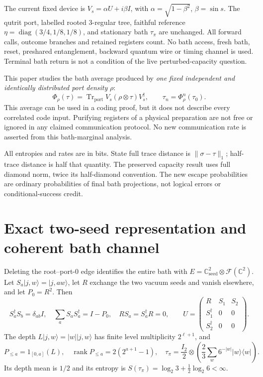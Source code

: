 \documentclass[11pt]{article}
\newcommand{\Tr}{\operatorname{Tr}}
\newcommand{\rank}{\operatorname{rank}}
\newcommand{\ket}[1]{\lvert #1\rangle}
\newcommand{\bra}[1]{\langle #1\rvert}
\begin{document}
The current fixed device is $V_s=\alpha U+i\beta I$, with
$\alpha=\sqrt{1-\beta^2}$, $\beta=\sin s$. The qutrit port, labelled
rooted 3-regular tree, faithful reference
$\eta=\operatorname{diag}(3/4,1/8,1/8)$, and stationary bath $\tau_\pi$
are unchanged. All forward calls, outcome branches and retained registers
count. No bath access, fresh bath, reset, preshared entanglement, backward
quantum wire or timing channel is used. Terminal bath return is not a
condition of the live perturbed-capacity question.

This paper studies the bath average produced by \emph{one fixed independent
and identically distributed port density} $\rho$:
\[
 \Phi_\rho(\tau)=\Tr_{\mathrm{port}}
   V_s(\rho\otimes\tau)V_s^\dagger,\qquad \tau_n=\Phi_\rho^n(\tau_0).
\]
This average can be used in a coding proof, but it does not describe every
correlated code input. Purifying registers of a physical preparation are
not free or ignored in any claimed communication protocol. No new
communication rate is asserted from this bath-marginal analysis.

All entropies and rates are in bits. State full trace distance is
$\|\sigma-\tau\|_1$; half-trace distance is half that quantity. The preserved
capacity result uses full diamond norm, twice its half-diamond convention.
The new escape probabilities are ordinary probabilities of final bath
projections, not logical errors or conditional-success credit.

\section{Exact two-seed representation and coherent bath channel}

Deleting the root--port-0 edge identifies the entire bath with
$E=\mathbb C^2_{\mathrm{seed}}\otimes\mathcal F(\mathbb C^2)$.
Let $S_a\ket{j,w}=\ket{j,aw}$, let $R$ exchange the two vacuum seeds and
vanish elsewhere, and let $P_0=R^2$. Then
\[
 S_a^\dagger S_b=\delta_{ab}I,\quad
 \sum_aS_aS_a^\dagger=I-P_0,\quad
 RS_a=S_a^\dagger R=0,
 \qquad
 U=\begin{pmatrix}R&S_1&S_2\\S_1^\dagger&0&0\\S_2^\dagger&0&0\end{pmatrix}.
 \tag{1}
\]
The depth $L\ket{j,w}=|w|\ket{j,w}$ has finite level multiplicity
$2^{\ell+1}$, and
\[
 P_{\le a}=1_{[0,a]}(L),\quad
 \rank P_{\le a}=2(2^{a+1}-1),\quad
 \tau_\pi=\frac{I_2}{2}\otimes
 \left(\frac23\sum_w6^{-|w|}\ket w\bra w\right).
 \tag{2}
\]
Its depth mean is $1/2$ and its entropy is
$S(\tau_\pi)=\log_2 3+\tfrac12\log_2 6<\infty$.
\end{document}
